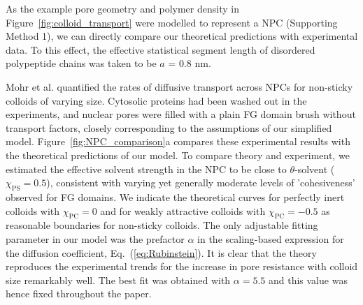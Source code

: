 \documentclass[12pt, a4paper]{article}
\begin{document}
As the example pore geometry and polymer density in Figure~\ref{fig:colloid_transport} were modelled to represent a NPC (Supporting Method 1), we can directly compare our theoretical predictions with experimental data. To this effect, the effective statistical segment length of disordered polypeptide chains was taken to be $a$ = 0.8 nm. 

Mohr et al. \cite{Mohr2009} quantified the rates of diffusive transport across NPCs for non-sticky colloids of varying size.
Cytosolic proteins had been washed out in the experiments, and nuclear pores were filled with a plain FG domain brush without transport factors, closely corresponding to the assumptions of our simplified model.
Figure~\ref{fig:NPC_comparison}a compares these experimental results with the theoretical predictions of our model.
To compare theory and experiment, we estimated the effective solvent strength in the NPC to be close to $\theta$-solvent ($\chi_{\text{PS}} = 0.5$), consistent with varying yet generally moderate levels of 'cohesiveness' observed for FG domains.
We indicate the theoretical curves for perfectly inert colloids with $\chi_{\text{PC}} = 0$ and for weakly attractive colloids with $\chi_{\text{PC}} = -0.5$ as reasonable boundaries for non-sticky colloids. 
The only adjustable fitting parameter in our model was the prefactor $\alpha$ in the scaling-based expression for the diffusion coefficient, Eq.~(\ref{eq:Rubinstein}).
It is clear that the theory reproduces the experimental trends for the increase in pore resistance with colloid size remarkably well.
The best fit was obtained with $\alpha = 5.5$ and this value was hence fixed  throughout the paper.
\end{document}
